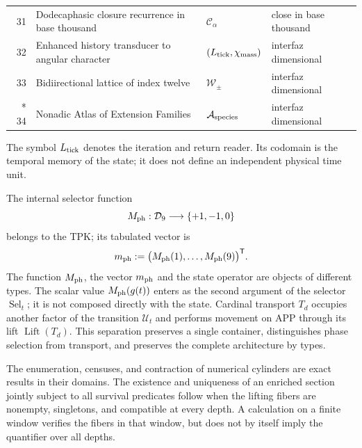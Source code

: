\begin{longtable}{@{}r >{\raggedright\arraybackslash}p{}
  >{\raggedright\arraybackslash}p{}
  >{\raggedright\arraybackslash}p{}@{}}
31 & Dodecaphasic closure recurrence in base thousand
  & \(\mathcal C_\alpha\) & close in base thousand \\
32 & Enhanced history transducer to angular character
  & \((L_{\rm tick},\chi_{\rm mass})\) & interfaz dimensional \\
33 & Bidiirectional lattice of index twelve
  & \(\mathcal W_{\pm}\) & interfaz dimensional \\*
34 & Nonadic Atlas of Extension Families
  & \(\mathcal A_{\rm species}\) & interfaz dimensional \\
\bottomrule
\end{longtable}
\endgroup

The symbol \(L_{\rm tick}\) denotes the iteration and return reader. Its
codomain is the temporal memory of the state; it does not define an independent physical
time unit.

The internal selector function
\[
 M_{\rm ph}:\mathcal D_9\longrightarrow\{+1,-1,0\}
\]
belongs to the TPK\@; its tabulated vector is
\[
 m_{\rm ph}:=\bigl(M_{\rm ph}(1),\ldots,M_{\rm ph}(9)\bigr)^{\mathsf T}.
\]
The function \(M_{\rm ph}\), the vector \(m_{\rm ph}\) and the state operator
are objects of different types. The scalar value \(M_{\rm ph}(g(t))\) enters
as the second argument of the selector \(\operatorname{Sel}_t\); it is not composed
directly with the state. Cardinal transport \(T_d\) occupies another factor
of the transition \(\mathcal U_t\) and performs movement on APP through
its lift \(\operatorname{Lift}(T_d)\). This separation preserves a single
container, distinguishes phase selection from transport, and preserves the
complete architecture by types.

\begin{resultbox}[title={Finite depth and enriched limit}]
The enumeration, censuses, and contraction of numerical cylinders are
exact results in their domains. The existence and uniqueness of an enriched
section jointly subject to all survival predicates
follow when the lifting fibers are nonempty, singletons, and
compatible at every depth. A calculation on a finite window
verifies the fibers in that window, but does not by itself imply the
quantifier over all depths.
\end{resultbox}

